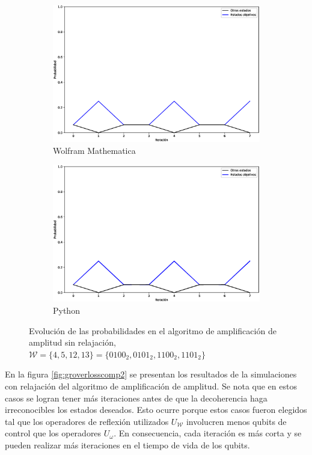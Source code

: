\begin{figure}[H]
    \centering
    \begin{subfigure}[m]{0.49\textwidth}
        \centering
        \includegraphics[width=0.9\linewidth]{img/grover3M.eps}
        \caption{Wolfram Mathematica}
    \end{subfigure}
    \begin{subfigure}[m]{0.49\textwidth}
        \centering
        \includegraphics[width=0.9\linewidth]{img/grover3lossless.eps}
        \caption{Python}
    \end{subfigure}
    \caption[Evolución de las probabilidades en el algoritmo de amplificación de amplitud sin relajación, $\mathcal{W} = \{4, 5, 12, 13\}$]{Evolución de las probabilidades en el algoritmo de amplificación de amplitud sin relajación, $\mathcal{W} = \{4, 5, 12, 13\} = \{0100_2, 0101_2, 1100_2, 1101_2\}$}
    \label{fig:groverlosslesscomp3}
\end{figure}

En la figura \ref{fig:groverlosscomp2} se presentan los resultados de la simulaciones con relajación del algoritmo de amplificación de amplitud. Se nota que en estos casos se logran tener más iteraciones antes de que la decoherencia haga irreconocibles los estados deseados. Esto ocurre porque estos casos fueron elegidos tal que los operadores de reflexión utilizados $U_\mathcal{W}$ involucren menos qubits de control que los operadores $U_\omega$. En consecuencia, cada iteración es más corta y se pueden realizar más iteraciones en el tiempo de vida de los qubits.

